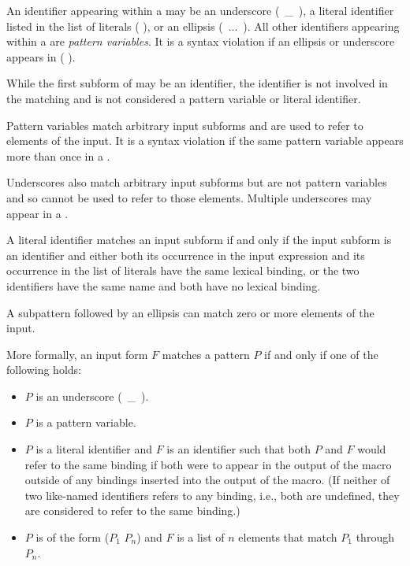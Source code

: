 \begin{entry}{%
\litprotoexpandnoindex{\_}
}
An identifier appearing within a  may be an underscore
(~{\cf \_}~), a literal identifier listed in the list of literals
{\cf ( \dotsfoo)}, or an ellipsis (~{\cf ...}~).
All other identifiers appearing within a  are
\textit{pattern variables}.
It is a syntax violation if an ellipsis or underscore appears in {\cf ( \dotsfoo)}.

While the first subform of  may be an identifier, the
identifier is not involved in the matching and
is not considered a pattern variable or literal identifier.

Pattern variables match arbitrary input subforms and
are used to refer to elements of the input.
It is a syntax violation if the same pattern variable appears more than once in a
.

Underscores also match arbitrary input subforms but are not pattern variables
and so cannot be used to refer to those elements.
Multiple underscores may appear in a .

A literal identifier matches an input subform if and only if the input
subform is an identifier and either both its occurrence in the input
expression and its occurrence in the list of literals have the same
lexical binding, or the two identifiers have the same name and both have
no lexical binding.

A subpattern followed by an ellipsis can match zero or more elements of
the input.

More formally, an input form $F$ matches a pattern $P$ if and only if
one of the following holds:

\begin{itemize}
\item $P$ is an underscore (~{\cf \_}~).

\item $P$ is a pattern variable.

\item $P$ is a literal identifier
and $F$ is an identifier such that both $P$ and $F$ would refer to the
same binding if both were to appear in the output of the macro outside
of any bindings inserted into the output of the macro.
(If neither of two like-named identifiers refers to any binding, i.e., both
are undefined, they are considered to refer to the same binding.)

\item $P$ is of the form
{\cf ($P_1$ \dotsfoo{} $P_n$)}
and $F$ is a list of $n$ elements that match $P_1$ through
$P_n$.


\end{itemize}
\end{entry}
